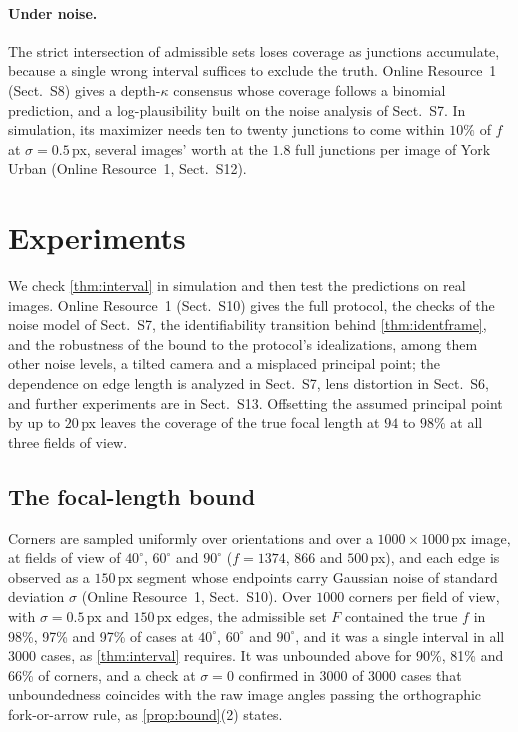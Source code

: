 \documentclass[pdflatex,sn-mathphys-num,iicol]{sn-jnl}
\newcommand{\OR}{Online Resource~1}
\theoremstyle{thmstyleone}
\theoremstyle{thmstylethree}
\theoremstyle{thmstyletwo}
\begin{document}
\paragraph{Under noise.} The strict intersection of admissible sets loses coverage as junctions accumulate, because a single wrong interval suffices to exclude the truth. \OR{} (Sect.~S8) gives a depth-$\kappa$ consensus whose coverage follows a binomial prediction, and a log-plausibility built on the noise analysis of Sect.~S7. In simulation, its maximizer needs ten to twenty junctions to come within $10\%$ of $f$ at $\sigma=0.5$\,px, several images' worth at the $1.8$ full junctions per image of York Urban (\OR, Sect.~S12).

\section{Experiments}\label{sec:experiments}

We check \cref{thm:interval} in simulation and then test the predictions on real images. \OR{} (Sect.~S10) gives the full protocol, the checks of the noise model of Sect.~S7, the identifiability transition behind \cref{thm:identframe}, and the robustness of the bound to the protocol's idealizations, among them other noise levels, a tilted camera and a misplaced principal point; the dependence on edge length is analyzed in Sect.~S7, lens distortion in Sect.~S6, and further experiments are in Sect.~S13. Offsetting the assumed principal point by up to $20$\,px leaves the coverage of the true focal length at $94$ to $98\%$ at all three fields of view.

\subsection{The focal-length bound}\label{sec:e2}
Corners are sampled uniformly over orientations and over a $1000\times1000$\,px image, at fields of view of $40^\circ$, $60^\circ$ and $90^\circ$ ($f=1374$, $866$ and $500$\,px), and each edge is observed as a $150$\,px segment whose endpoints carry Gaussian noise of standard deviation $\sigma$ (\OR, Sect.~S10). Over $1000$ corners per field of view, with $\sigma=0.5$\,px and $150$\,px edges, the admissible set $F$ contained the true $f$ in 98\%, 97\% and 97\% of cases at $40^\circ$, $60^\circ$ and $90^\circ$, and it was a single interval in all $3000$ cases, as \cref{thm:interval} requires. It was unbounded above for 90\%, 81\% and 66\% of corners, and a check at $\sigma=0$ confirmed in $3000$ of $3000$ cases that unboundedness coincides with the raw image angles passing the orthographic fork-or-arrow rule, as \cref{prop:bound}(2) states.
\end{document}
